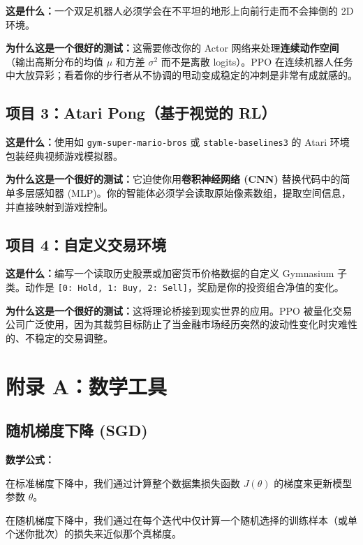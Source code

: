\documentclass[12pt,a4paper]{article}
\theoremstyle{noteplain}
\theoremstyle{noteexercise}
\begin{document}
\textbf{这是什么：}一个双足机器人必须学会在不平坦的地形上向前行走而不会摔倒的 2D 环境。

\textbf{为什么这是一个很好的测试：}这需要修改你的 Actor 网络来处理\textbf{连续动作空间}（输出高斯分布的均值 $\mu$ 和方差 $\sigma^2$ 而不是离散 logits）。PPO 在连续机器人任务中大放异彩；看着你的步行者从不协调的甩动变成稳定的冲刺是非常有成就感的。

\subsection{项目 3：Atari Pong（基于视觉的 RL）}

\textbf{这是什么：}使用如 \lstinline|gym-super-mario-bros| 或 \lstinline|stable-baselines3| 的 Atari 环境包装经典视频游戏模拟器。

\textbf{为什么这是一个很好的测试：}它迫使你用\textbf{卷积神经网络 (CNN)} 替换代码中的简单多层感知器 (MLP)。你的智能体必须学会读取原始像素数组，提取空间信息，并直接映射到游戏控制。

\subsection{项目 4：自定义交易环境}

\textbf{这是什么：}编写一个读取历史股票或加密货币价格数据的自定义 Gymnasium 子类。动作是 \lstinline|[0: Hold, 1: Buy, 2: Sell]|，奖励是你的投资组合净值的変化。

\textbf{为什么这是一个很好的测试：}这将理论桥接到现实世界的应用。PPO 被量化交易公司广泛使用，因为其裁剪目标防止了当金融市场经历突然的波动性变化时灾难性的、不稳定的交易调整。

\section{附录 A：数学工具}\label{sec:appendix-math}

\subsection{随机梯度下降 (SGD)}

\textbf{数学公式：}

在标准梯度下降中，我们通过计算整个数据集损失函数 $J(\theta)$ 的梯度来更新模型参数 $\theta$。

在随机梯度下降中，我们通过在每个迭代中仅计算一个随机选择的训练样本（或单个迷你批次）的损失来近似那个真梯度。
\end{document}
